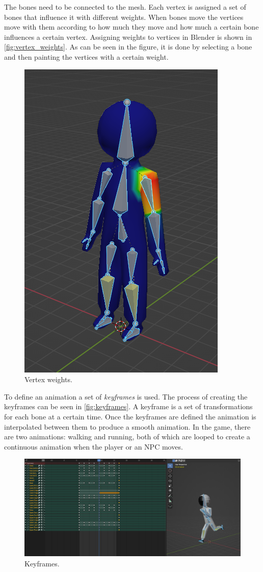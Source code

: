 The bones need to be connected to the mesh.
Each vertex is assigned a set of bones that influence it with different weights.
When bones move the vertices move with them according to how much they move and how much a certain bone influences a certain vertex.
Assigning weights to vertices in Blender is shown in \autoref{fig:vertex_weights}.
As can be seen in the figure, it is done by selecting a bone and then painting the vertices with a certain weight.

\begin{figure}[!htb]
    \centering
    \includegraphics[height=0.45\textwidth]{chapters/theoretical_foundations/sections/models/resources/WeightPaint.png}
    \caption{Vertex weights.}
    \label{fig:vertex_weights}
\end{figure}

To define an animation a set of \textit{keyframes} is used.
The process of creating the keyframes can be seen in \autoref{fig:keyframes}.
A keyframe is a set of transformations for each bone at a certain time.
Once the keyframes are defined the animation is interpolated between them to produce a smooth animation.
In the game, there are two animations: walking and running, both of which are looped to create a continuous animation when the player or an NPC moves.

\begin{figure}[!htb]
    \centering
    \includegraphics[width=1\textwidth]{chapters/theoretical_foundations/sections/models/resources/DopeSheet.png}
    \caption{Keyframes.}
    \label{fig:keyframes}
\end{figure}


